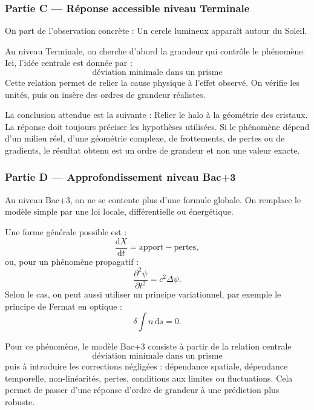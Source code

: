 \documentclass[11pt,a4paper]{article}
\begin{document}
\subsubsection*{Partie C — Réponse accessible niveau Terminale}

\begin{corrigebox}
On part de l'observation concrète : Un cercle lumineux apparaît autour du Soleil.

Au niveau Terminale, on cherche d'abord la grandeur qui contrôle le phénomène. Ici, l'idée centrale est donnée par :
\[
\text{déviation minimale dans un prisme}
\]
Cette relation permet de relier la cause physique à l'effet observé. On vérifie les unités, puis on insère des ordres de grandeur réalistes.

La conclusion attendue est la suivante : Relier le halo à la géométrie des cristaux. La réponse doit toujours préciser les hypothèses utilisées. Si le phénomène dépend d'un milieu réel, d'une géométrie complexe, de frottements, de pertes ou de gradients, le résultat obtenu est un ordre de grandeur et non une valeur exacte.
\end{corrigebox}

\subsubsection*{Partie D — Approfondissement niveau Bac+3}

\begin{approfondissementbox}
Au niveau Bac+3, on ne se contente plus d'une formule globale. On remplace le modèle simple par une loi locale, différentielle ou énergétique.

Une forme générale possible est :
\[
\frac{\mathrm d X}{\mathrm dt}=\text{apport}-\text{pertes},
\]
ou, pour un phénomène propagatif :
\[
\frac{\partial^2 \psi}{\partial t^2}=c^2\Delta\psi.
\]
Selon le cas, on peut aussi utiliser un principe variationnel, par exemple le principe de Fermat en optique :
\[
\delta \int n\,\mathrm ds=0.
\]

Pour ce phénomène, le modèle Bac+3 consiste à partir de la relation centrale
\[
\text{déviation minimale dans un prisme}
\]
puis à introduire les corrections négligées : dépendance spatiale, dépendance temporelle, non-linéarités, pertes, conditions aux limites ou fluctuations. Cela permet de passer d'une réponse d'ordre de grandeur à une prédiction plus robuste.
\end{approfondissementbox}
\end{document}
